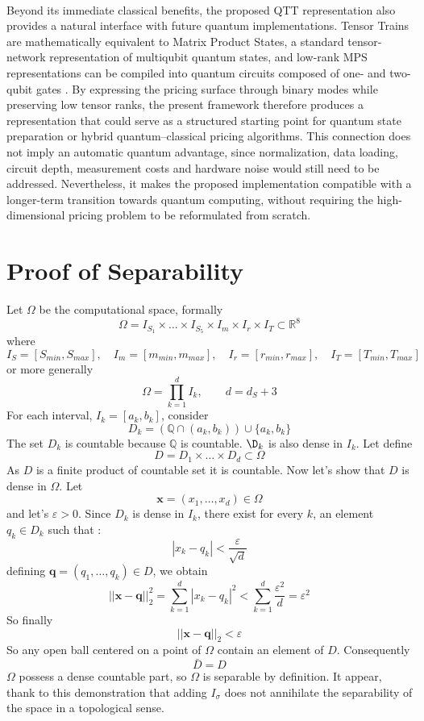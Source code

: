 \documentclass{article}
\numberwithin{equation}{subsection}
\theoremstyle{definition}
\theoremstyle{remark}
\begin{document}
\\
Beyond its immediate classical benefits, the proposed QTT representation also provides a natural interface with future quantum implementations. Tensor Trains are mathematically equivalent to Matrix Product States, a standard tensor-network representation of multiqubit quantum states, and low-rank MPS representations can be compiled into quantum circuits composed of one- and two-qubit gates \cite{orus2014tensorNetworks,Ran2020MPSQuantumCircuits}. By expressing the pricing surface through binary modes while preserving low tensor ranks, the present framework therefore produces a representation that could serve as a structured starting point for quantum state preparation or hybrid quantum--classical pricing algorithms. This connection does not imply an automatic quantum advantage, since normalization, data loading, circuit depth, measurement costs and hardware noise would still need to be addressed. Nevertheless, it makes the proposed implementation compatible with a longer-term transition towards quantum computing, without requiring the high-dimensional pricing problem to be reformulated from scratch.

\appendix

\section{Proof of Separability}
\label{app:separability-proof}
Let $\Omega$ be the computational space, formally
\[
\Omega = I_{S_1}\times \dots \times I_{S_5} \times I_m \times I_r \times I_T \subset \mathbb{R}^8
\]
where 
\[
I_S = [S_{min},S_{max}], \quad I_m = [m_{min}, m_{max}], \quad I_r = [r_{min}, r_{max}], \quad I_T =[T_{min}, T_{max}]
\]
or more generally 
\[
\Omega = \prod _{k=1} ^d I_k, \qquad d = d_S +3
\]
For each interval, $I_k = [a_k, b_k]$, consider 
\[
D_k = \left(\mathbb{Q} \cap (a_k,b_k) \right) \cup \{a_k,b_k\}
\]
The set $D_k$ is countable because $\mathbb{Q}$ is countable. $\D_k$ is also dense in $I_k$. Let define 
\[
D = D_1 \times \dots \times D_d \subset \Omega
\]
As $D$ is a finite product of countable set it is countable. Now let's show that $D$ is dense in $\Omega$. Let 
\[
\boldsymbol{x} = (x_1,\dots,x_d) \in \Omega
\]
and let's $\varepsilon > 0$. Since $D_k$ is dense in $I_k$, there exist for every $k$, an element $q_k \in D_k$ such that :
\[
|x_k - q_k| < \frac{\varepsilon}{\sqrt{d}}
\]
defining $\boldsymbol{q} = (q_1,\dots,q_k) \in D$, we obtain 
\[
||\boldsymbol{x} - \boldsymbol{q}||_2 ^2 = \sum _{k=1} ^d |x_k - q_k|^2 < \sum ^d _{k=1} \frac{\varepsilon ^2}{d} = \varepsilon^2
\]
So finally 
\[
||\boldsymbol{x} - \boldsymbol{q}||_2 < \varepsilon
\]
So any open ball centered on a point of $\Omega$ contain an element of $D$. Consequently 
\[
\bar{D} = D
\]
$\Omega$ possess a dense countable part, so $\Omega$ is separable by definition. It appear, thank to this demonstration that adding $I_{\sigma}$ does not annihilate the separability of the space in a topological sense. 

\newpage


\end{document}
